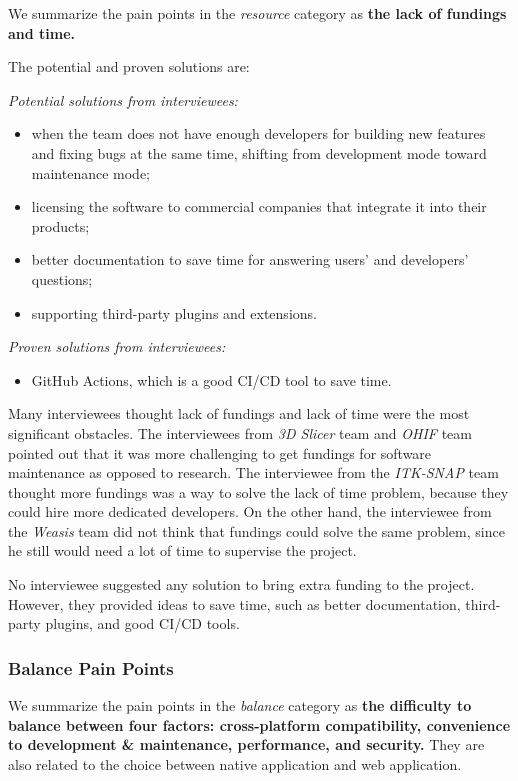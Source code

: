 \documentclass[preprint,12pt,authoryear]{elsarticle}
\begin{document}
We summarize the pain points in the \textit{resource} category as
\textbf{the lack of fundings and time.}

The potential and proven solutions are:

\noindent\textit{Potential solutions from interviewees:}
\begin{itemize}
\item when the team does not have enough developers for building new features
and fixing bugs at the same time, shifting from development mode toward
maintenance mode;
\item licensing the software to commercial companies that integrate it into
their products;
\item better documentation to save time for answering users' and developers'
questions;
\item supporting third-party plugins and extensions.
\end{itemize}

\noindent\textit{Proven solutions from interviewees:}

\begin{itemize}
\item GitHub Actions, which is a good CI/CD tool to save time.
\end{itemize}

Many interviewees thought lack of fundings and lack of time were the most
significant obstacles. The interviewees from \textit{3D Slicer} team and
\textit{OHIF} team pointed out that it was more challenging to get fundings for
software maintenance as opposed to research. The interviewee from the
\textit{ITK-SNAP} team thought more fundings was a way to solve the lack of time
problem, because they could hire more dedicated developers. On the other hand,
the interviewee from the \textit{Weasis} team did not think that fundings could
solve the same problem, since he still would need a lot of time to supervise the
project.

No interviewee suggested any solution to bring extra funding to the project.
However, they provided ideas to save time, such as better documentation,
third-party plugins, and good CI/CD tools.

\subsubsection{Balance Pain Points} \label{sec_pain_points_2}

We summarize the pain points in the \textit{balance} category as \textbf{the
difficulty to balance between four factors: cross-platform compatibility,
convenience to development \& maintenance, performance, and security.} They are
also related to the choice between native application and web application.
\end{document}
